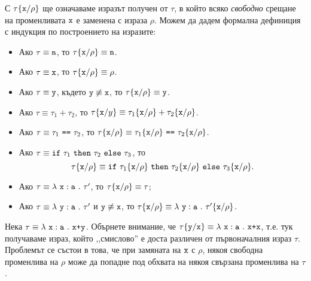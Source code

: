 С $\tau\{\texttt{x}/{\rho}\}$ ще означаваме изразът получен от $\tau$, в който всяко \emph{свободно} срещане на променливата $\texttt{x}$
е заменена с израза $\rho$. Можем да дадем формална дефиниция с индукция по построението на изразите:
\begin{itemize}
\item
  Ако $\tau \equiv \texttt{n}$, то $\tau\{\texttt{x}/{\rho}\} \equiv \texttt{n}$.
\item
  Ако $\tau \equiv \texttt{x}$, то $\tau\{\texttt{x}/{\rho}\} \equiv \rho$.
\item
  Ако $\tau \equiv \texttt{y}$, където $\texttt{y} \not\equiv \texttt{x}$, то $\tau\{\texttt{x}/{\rho}\} \equiv \texttt{y}$.
\item
  Ако $\tau \equiv \tau_1 + \tau_2$, то $\tau\{\texttt{x}/{y}\} \equiv \tau_1\{\texttt{x}/{\rho}\} + \tau_2\{\texttt{x}/{\rho}\}$.
\item
  Ако $\tau \equiv \tau_1\ \vv{==}\ \tau_2$, то $\tau\rename{x}{\rho} \equiv \tau_1\rename{x}{\rho}\ \vv{==}\ \tau_2\rename{x}{\rho}$.
\item
  Ако $\tau \equiv \texttt{if}\ \tau_1\ \texttt{then}\ \tau_2\ \texttt{else}\ \tau_3$, то
  \[\tau\{\texttt{x}/{\rho}\} \equiv \texttt{if}\ \tau_1\{\texttt{x}/{\rho}\}\ \texttt{then}\ \tau_2\{\texttt{x}/{\rho}\}\ \texttt{else}\ \tau_3\{\texttt{x}/{\rho}\}.\]
\item
  Ако $\tau \equiv \lambda~\texttt{x}:\texttt{a}~.~{\tau'}$, то $\tau\{\texttt{x}/{\rho}\} \equiv \tau$;
\item
  Ако $\tau \equiv \lambda~\texttt{y}:\texttt{a}~.~{\tau'}$ и $\texttt{y} \not\equiv \texttt{x}$, то
  $\tau\{\texttt{x}/{\rho}\} \equiv \lambda~\texttt{y}:\texttt{a}~.~{\tau'\{\texttt{x}/{\rho}\}}$.
\end{itemize}

Нека $\tau \equiv \lambda~\texttt{x}:\texttt{a}~.~{\texttt{x+y}}$. Обърнете внимание, че $\tau\{\texttt{y}/{\texttt{x}}\} \equiv \lambda~\texttt{x}:\texttt{a}~.~{\texttt{x+x}}$,
т.е. тук получаваме израз, който ,,смислово'' е доста различен от първоначалния израз $\tau$.
Проблемът се състои в това, че при замяната на $\texttt{x}$ с $\rho$, някоя свободна променлива на $\rho$ може да попадне под обхвата на някоя свързана
променлива на $\tau$.

